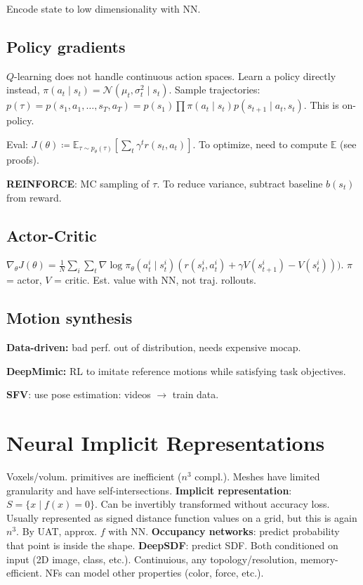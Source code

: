 \documentclass[11pt,landscape,a4paper,fleqn]{article}
\newcommand{\E}{\mathbb{E}}
\begin{document}
\begin{multicols*}{4}
Encode state to low dimensionality with NN.

\subsection{Policy gradients}

$Q$-learning does not handle continuous action spaces.
Learn a policy directly instead,
$\pi(a_t \mid s_t) = \mathcal{N}(\mu_t, \sigma_t^2 \mid s_t)$.
Sample trajectories: $p(\tau) = p(s_1, a_1, \dots, s_T, a_T) = p(s_1) \prod \pi(a_t \!\!\mid\!\! s_t) p(s_{t+1} \!\!\mid\!\! a_t, s_t)$.
This is on-policy.

Eval: $J(\theta) \coloneqq \E_{\tau \sim p_\theta(\tau)} [\sum_t \gamma^t r(s_t, a_t)]$.
To optimize, need to compute $\E$ (see proofs).

\textbf{REINFORCE}: MC sampling of $\tau$.
To reduce variance, subtract baseline $b(s_t)$ from reward.

\subsection{Actor-Critic}

$\nabla_\theta J(\theta) = \frac{1}{N} \sum_i \sum_t \nabla \log \pi_\theta(a_t^i \mid s_t^i)(r(s_t^i, a_t^i) + \gamma V(s_{t+1}^i) - V(s_t^i)))$. $\pi$ = actor, $V$ = critic.
Est. value with NN, not traj. rollouts.

\subsection{Motion synthesis}

\textbf{Data-driven:}
bad perf. out of distribution,
needs expensive mocap.

\textbf{DeepMimic:} RL to imitate reference motions while satisfying task objectives.

\textbf{SFV}: use pose estimation: videos $\to$ train data.

% 

\section{Neural Implicit Representations}

Voxels/volum. primitives are inefficient ($n^3$ compl.).
Meshes have limited granularity and have self-intersections.
\textbf{Implicit representation}: $S = \{x \mid f(x) = 0\}$.
Can be invertibly transformed without accuracy loss.
Usually represented as signed distance function values on a grid, but this is again $n^3$.
By UAT, approx. $f$ with NN.
\textbf{Occupancy networks}: predict probability that point is inside the shape.
\textbf{DeepSDF}: predict SDF.
Both conditioned on input (2D image, class, etc.).
Continuious, any topology/resolution, memory-efficient.
NFs can model other properties (color, force, etc.).


\end{multicols*}
\end{document}
